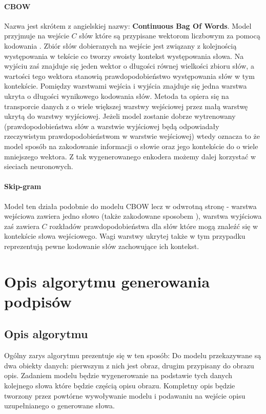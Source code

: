 \paragraph{CBOW}
Nazwa jest skrótem z angielskiej nazwy: \textbf{Continuous Bag Of Words}.
Model przyjmuje na wejście $C$ słów które są przypisane wektorom liczbowym za pomocą kodowania . Zbiór słów dobieranych na wejście jest związany z kolejnością występowania w tekście co tworzy swoisty kontekst występowania słowa. Na wyjściu zaś znajduje się jeden wektor o długości równej wielkości zbioru słów, a wartości tego wektora stanowią prawdopodobieństwo występowania słów w tym kontekście. Pomiędzy warstwami wejścia i wyjścia znajduje się jedna warstwa ukryta o długości wynikowego kodowania słów. Metoda ta opiera się na transporcie danych z o wiele większej warstwy wejściowej przez małą warstwę ukrytą do warstwy wyjściowej. Jeżeli model zostanie dobrze wytrenowany (prawdopodobieństwa słów a warstwie wyjściowej będą odpowiadały rzeczywistym prawdopodobieństwom w warstwie wejściowej) wtedy oznacza to że model  sposób na zakodowanie informacji o słowie oraz jego kontekście do o wiele mniejszego wektora. Z tak wygenerowanego enkodera możemy dalej korzystać w sieciach neuronowych. \cite[p.~1,3]{word-embed}
\paragraph{Skip-gram}
Model ten działa podobnie do modelu CBOW lecz w odwrotną stronę - warstwa wejściowa zawiera jedno słowo (także zakodowane sposobem ), warstwa wyjściowa zaś zawiera $C$ rozkładów prawdopodobieństwa dla słów które mogą znaleźć się w kontekście słowa wejściowego. Wagi warstwy ukrytej także w tym przypadku reprezentują pewne kodowanie słów zachowujące ich kontekst.

\newpage

\section{Opis algorytmu generowania podpisów}

\subsection{Opis algorytmu}
Ogólny zarys algorytmu prezentuje się w ten sposób: Do modelu przekazywane są dwa obiekty danych: pierwszym z nich jest obraz, drugim przypisany do obrazu opis. Zadaniem modelu będzie wygenerowanie na podstawie tych danych kolejnego słowa które będzie częścią opisu obrazu. Kompletny opis będzie tworzony przez powtórne wywoływanie modelu i podawaniu na wejście opisu uzupełnianego o generowane słowa. 

